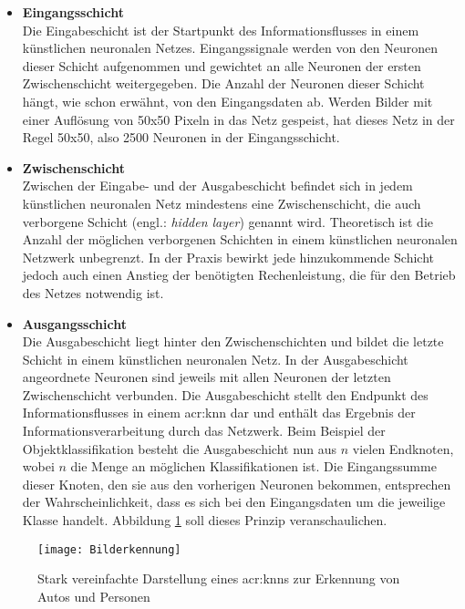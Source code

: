 \begin{itemize}
\item \textbf{Eingangsschicht}\\
Die Eingabeschicht ist der Startpunkt des Informationsflusses in einem künstlichen neuronalen Netzes. Eingangssignale werden von den Neuronen dieser Schicht aufgenommen und gewichtet an alle Neuronen der ersten Zwischenschicht weitergegeben. Die Anzahl der Neuronen dieser Schicht hängt, wie schon erwähnt, von den Eingangsdaten ab. Werden Bilder mit einer Auflösung von 50x50 Pixeln in das Netz gespeist, hat dieses Netz in der Regel 50x50, also 2500 Neuronen in der Eingangsschicht.

\item \textbf{Zwischenschicht}\\
Zwischen der Eingabe- und der Ausgabeschicht befindet sich in jedem künstlichen neuronalen Netz mindestens eine Zwischenschicht, die auch verborgene Schicht (engl.: \textit{hidden layer}) genannt wird. Theoretisch ist die Anzahl der möglichen verborgenen Schichten in einem künstlichen neuronalen Netzwerk unbegrenzt. In der Praxis bewirkt jede hinzukommende Schicht jedoch auch einen Anstieg der benötigten Rechenleistung, die für den Betrieb des Netzes notwendig ist.

\item \textbf{Ausgangsschicht}\\
Die Ausgabeschicht liegt hinter den Zwischenschichten und bildet die letzte Schicht in einem künstlichen neuronalen Netz. In der Ausgabeschicht angeordnete Neuronen sind jeweils mit allen Neuronen der letzten Zwischenschicht verbunden. Die Ausgabeschicht stellt den Endpunkt des Informationsflusses in einem \acrshort{acr:knn} dar und enthält das Ergebnis der Informationsverarbeitung durch das Netzwerk. Beim Beispiel der Objektklassifikation besteht die Ausgabeschicht nun aus \(n\) vielen Endknoten, wobei \(n\) die Menge an möglichen Klassifikationen ist. Die Eingangssumme dieser Knoten, den sie aus den vorherigen Neuronen bekommen, entsprechen der Wahrscheinlichkeit, dass es sich bei den Eingangsdaten um die jeweilige Klasse handelt. Abbildung \ref{fig:Bilderkennung} soll dieses Prinzip veranschaulichen.
\end{itemize}

\begin{figure}%
	\centering
    \texttt{[image: Bilderkennung]}
    \caption{Stark vereinfachte Darstellung eines \acrshort{acr:knn}s zur Erkennung von Autos und Personen}
    \label{fig:Bilderkennung}
\end{figure}

